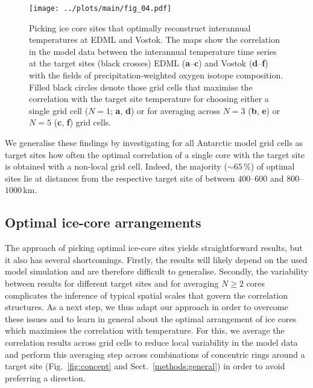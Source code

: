 \documentclass[cp, manuscript]{copernicus}
\begin{document}
\begin{figure*}[t]%
\centering
\texttt{[image: ../plots/main/fig\_04.pdf]}
\caption[Picking optimal sites]{%
  Picking ice core sites that optimally reconstruct interannual temperatures at
  EDML and Vostok. The maps show the correlation in the model data between the
  interannual temperature time series at the target sites (black crosses) EDML
  (\textbf{a}--\textbf{c}) and Vostok (\textbf{d}--\textbf{f}) with the fields
  of precipitation-weighted oxygen isotope composition. Filled black circles
  denote those grid cells that maximise the correlation with the target site
  temperature for choosing either a single grid cell ($N=1$; \textbf{a},
  \textbf{d}) or for averaging across $N=3$ (\textbf{b}, \textbf{e}) or $N=5$
  (\textbf{c}, \textbf{f}) grid cells.}
\label{fig:picking}%
\end{figure*}%

We generalise these findings by investigating for all Antarctic model grid cells
as target sites how often the optimal correlation of a single core with the
target site is obtained with a non-local grid cell. Indeed, the majority
($\sim65$\,\%) of optimal sites lie at distances from the respective target site
of between $400$--$600$ and $800$--$1000$\,km.


\subsection{Optimal ice-core arrangements}
\label{results:optim-spacing}

The approach of picking optimal ice-core sites yields straightforward results,
but it also has several shortcomings. Firstly, the results will likely depend on
the used model simulation and are therefore difficult to generalise. Secondly,
the variability between results for different target sites and for averaging
$N\ge2$ cores complicates the inference of typical spatial scales that govern
the correlation structures. As a next step, we thus adapt our approach in order
to overcome these issues and to learn in general about the optimal arrangement
of ice cores which maximises the correlation with temperature. For this, we
average the correlation results across grid cells to reduce local variability in
the model data and perform this averaging step across combinations of
concentric rings around a target site (Fig.~\ref{fig:concept} and
Sect.~\ref{methods:general}) in order to avoid preferring a direction.
\end{document}
